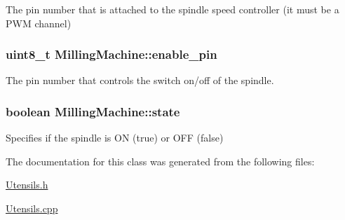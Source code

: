 The pin number that is attached to the spindle speed controller (it must be a P\+W\+M channel) 

\hypertarget{class_milling_machine_a129e02eb0a1b612587fd0175a413cfdd}{
\subsubsection[{enable\+\_\+pin}]{\setlength{\rightskip}{0pt plus 5cm}uint8\+\_\+t Milling\+Machine\+::enable\+\_\+pin\hspace{0.3cm}{\ttfamily [private]}}}\label{class_milling_machine_a129e02eb0a1b612587fd0175a413cfdd}


The pin number that controls the switch on/off of the spindle. 

\hypertarget{class_milling_machine_a8d46b3e3c141e9402a2729b61550babb}{
\subsubsection[{state}]{\setlength{\rightskip}{0pt plus 5cm}boolean Milling\+Machine\+::state\hspace{0.3cm}{\ttfamily [private]}}}\label{class_milling_machine_a8d46b3e3c141e9402a2729b61550babb}


Specifies if the spindle is O\+N (true) or O\+F\+F (false) 



The documentation for this class was generated from the following files\+:\begin{DoxyCompactItemize}
\item 
\hyperlink{_utensils_8h}{Utensils.\+h}\item 
\hyperlink{_utensils_8cpp}{Utensils.\+cpp}\end{DoxyCompactItemize}
